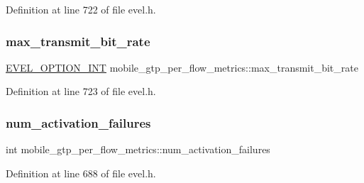 Definition at line 722 of file evel.\+h.

\hypertarget{structmobile__gtp__per__flow__metrics_af9edf92628a5ad61ce7368a81f241d54}{}\label{structmobile__gtp__per__flow__metrics_af9edf92628a5ad61ce7368a81f241d54} 
\subsubsection{\texorpdfstring{max\+\_\+transmit\+\_\+bit\+\_\+rate}{max\_transmit\_bit\_rate}}
{\footnotesize\ttfamily \hyperlink{evel_8h_a452d825778d1c2368a54b8f689a25ba7}{E\+V\+E\+L\+\_\+\+O\+P\+T\+I\+O\+N\+\_\+\+I\+NT} mobile\+\_\+gtp\+\_\+per\+\_\+flow\+\_\+metrics\+::max\+\_\+transmit\+\_\+bit\+\_\+rate}



Definition at line 723 of file evel.\+h.

\hypertarget{structmobile__gtp__per__flow__metrics_aa0ebbd133a7932699a0e4405fd6e351c}{}\label{structmobile__gtp__per__flow__metrics_aa0ebbd133a7932699a0e4405fd6e351c} 
\subsubsection{\texorpdfstring{num\+\_\+activation\+\_\+failures}{num\_activation\_failures}}
{\footnotesize\ttfamily int mobile\+\_\+gtp\+\_\+per\+\_\+flow\+\_\+metrics\+::num\+\_\+activation\+\_\+failures}



Definition at line 688 of file evel.\+h.

\hypertarget{structmobile__gtp__per__flow__metrics_a734b5a22e1c1d6f1956782fb415c4e2c}{}\label{structmobile__gtp__per__flow__metrics_a734b5a22e1c1d6f1956782fb415c4e2c} 
